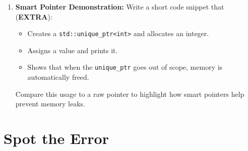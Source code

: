 \documentclass[a4paper,12pt]{article}
\begin{document}
\begin{enumerate}
    \item \textbf{Smart Pointer Demonstration:}
    Write a short code snippet that (\textbf{EXTRA}):
    \begin{itemize}
        \item Creates a \texttt{std::unique\_ptr<int>} and allocates an integer.
        \item Assigns a value and prints it.
        \item Shows that when the \texttt{unique\_ptr} goes out of scope, memory is automatically freed.
    \end{itemize}
    Compare this usage to a raw pointer to highlight how smart pointers help prevent memory leaks.
\end{enumerate}

\section{Spot the Error}
\end{document}
